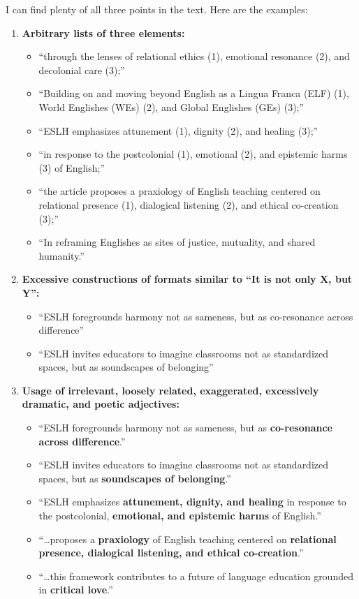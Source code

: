I can find plenty of all three points in the text. Here are the examples:

\begin{enumerate}
    \item \textbf{Arbitrary lists of three elements:}
    \begin{itemize}
        \item ``through the lenses of relational ethics (1), emotional resonance (2), and decolonial care (3);''
        \item ``Building on and moving beyond English as a Lingua Franca (ELF) (1), World Englishes (WEs) (2), and Global Englishes (GEs) (3);''
        \item ``ESLH emphasizes attunement (1), dignity (2), and healing (3);''
        \item ``in response to the postcolonial (1), emotional (2), and epistemic harms (3) of English;''
        \item ``the article proposes a praxiology of English teaching centered on relational presence (1), dialogical listening (2), and ethical co-creation (3);''
        \item ``In reframing Englishes as sites of justice, mutuality, and shared humanity.''
    \end{itemize}
    
    \item \textbf{Excessive constructions of formats similar to ``It is not only X, but Y'':}
    \begin{itemize}
        \item ``ESLH foregrounds harmony not as sameness, but as co-resonance across difference''
        \item ``ESLH invites educators to imagine classrooms not as standardized spaces, but as soundscapes of belonging''
    \end{itemize}
    
    \item \textbf{Usage of irrelevant, loosely related, exaggerated, excessively dramatic, and poetic adjectives:}
    \begin{itemize}
        \item ``ESLH foregrounds harmony not as sameness, but as \textbf{co-resonance across difference}.''
        \item ``ESLH invites educators to imagine classrooms not as standardized spaces, but as \textbf{soundscapes of belonging}.''
        \item ``ESLH emphasizes \textbf{attunement, dignity, and healing} in response to the postcolonial, \textbf{emotional, and epistemic harms} of English.''
        \item ``\dots proposes a \textbf{praxiology} of English teaching centered on \textbf{relational presence, dialogical listening, and ethical co-creation}.''
        \item ``\dots this framework contributes to a future of language education grounded in \textbf{critical love}.''
    \end{itemize}
\end{enumerate}


